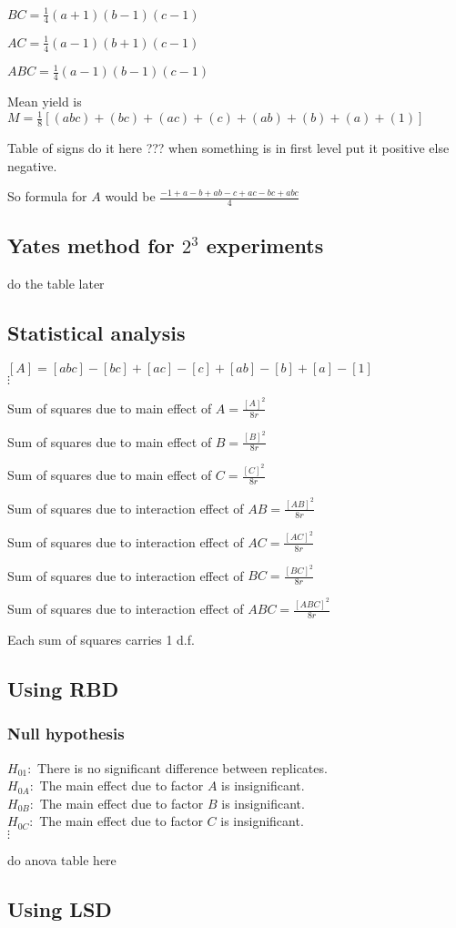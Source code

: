 \documentclass[oneside,11pt,pdftex]{book}%
\numberwithin{equation}{section}
\numberwithin{section}{chapter}
\numberwithin{equation}{chapter}
\begin{document}
$ BC=\frac{1}{4}(a+1)(b-1)(c-1) $

$ AC=\frac{1}{4}(a-1)(b+1)(c-1) $


$ ABC=\frac{1}{4}(a-1)(b-1)(c-1) $

Mean yield is $ M=\frac{1}{8}[(abc)+(bc)+(ac)+(c)+(ab)+(b)+(a)+(1)] $

Table of signs do it here ??? when something is in first level put it positive else negative.


So formula for $ A $ would be $ \frac{-1+a-b+ab-c+ac-bc+abc}{4} $

\subsection{Yates method for $ 2^3 $ experiments}
do the table later

\subsection{Statistical analysis}
$ [A] =[abc]-[bc]+[ac]-[c]+[ab]-[b]+[a]-[1]$\\
$ \vdots $

Sum of squares due to main effect of $ A=\frac{[A]^2}{8r} $

Sum of squares due to main effect of $ B=\frac{[B]^2}{8r} $


Sum of squares due to main effect of $ C=\frac{[C]^2}{8r} $


Sum of squares due to interaction effect of $ AB=\frac{[AB]^2}{8r} $

Sum of squares due to interaction effect of $ AC=\frac{[AC]^2}{8r} $

Sum of squares due to interaction effect of $ BC=\frac{[BC]^2}{8r} $

Sum of squares due to interaction effect of $ ABC=\frac{[ABC]^2}{8r} $

Each sum of squares carries 1 d.f.

\subsection{Using RBD}
\subsubsection{Null hypothesis}
$ H_{01}:$ There is no significant difference between replicates.\\
$ H_{0A} :$ The main effect due to factor $ A $ is insignificant.\\
$ H_{0B} :$ The main effect due to factor $ B $ is insignificant.\\
$ H_{0C} :$ The main effect due to factor $ C $ is insignificant.\\
$ \vdots $

do anova table here
\subsection{Using LSD}
\backmatter
\thispagestyle{empty}
\newpage
\end{document}
